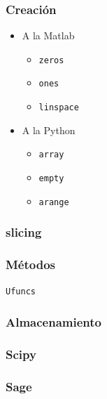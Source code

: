 \documentclass{beamer}
\begin{document}
\begin{frame}
  \frametitle{Creación}
  \begin{itemize}
  \item A la Matlab
    \begin{itemize}
    \item \texttt{zeros}
    \item \texttt{ones}
    \item \texttt{linspace}
    \end{itemize}
  \item A la Python
    \begin{itemize}
    \item \texttt{array}
    \item \texttt{empty}
    \item \texttt{arange}
    \end{itemize}
  \end{itemize}
\end{frame}

\begin{frame}
  \frametitle{slicing}
\end{frame}

\begin{frame}
  \frametitle{Métodos}
\end{frame}

\begin{frame}
  \texttt{Ufuncs}
\end{frame}

\begin{frame}
  \frametitle{Almacenamiento}
\end{frame}

\begin{frame}
  \frametitle{Scipy}
\end{frame}


\begin{frame}
  \frametitle{Sage}
  
\end{frame}
\end{document}
